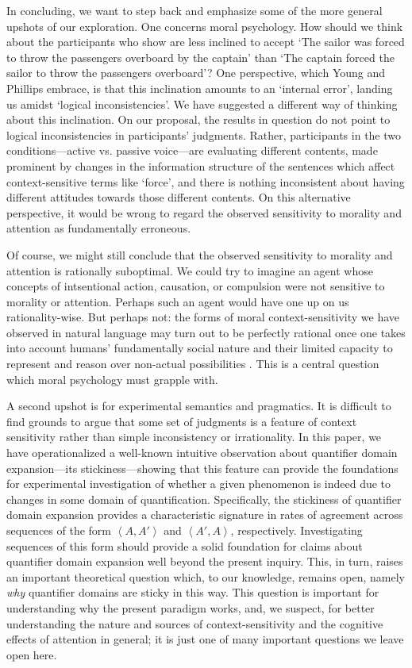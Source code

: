 \documentclass{salt}
\newcommand{\seq}[1]{\left\langle {#1} \right\rangle}
\begin{document}
In concluding, we want to step back and emphasize some of the more general upshots of our exploration. One concerns moral psychology. How should we think about the participants who show are less inclined to accept `The sailor was forced to throw the passengers overboard by the captain' than `The captain  forced the sailor to throw the passengers overboard'? One perspective, which Young and Phillips embrace, is that this inclination amounts to an `internal error', landing us amidst `logical inconsistencies'. We have suggested a different way of thinking about this inclination. On our proposal, the results in question do not point to logical inconsistencies in participants' judgments. Rather, participants in the two conditions---active vs. passive voice---are evaluating different contents, made prominent by changes in the information structure of the sentences which affect context-sensitive terms like `force', and there is nothing inconsistent about having different attitudes towards those different contents. On this alternative perspective, it would be wrong to regard the observed sensitivity to morality and attention as fundamentally erroneous. 

Of course, we might still conclude that the observed sensitivity to morality and attention is rationally suboptimal. We could try to imagine an agent whose concepts of intsentional action, causation, or compulsion were not sensitive to morality or attention. Perhaps such an agent would have one up on us rationality-wise. But perhaps not: the forms of moral context-sensitivity we have observed in natural language may turn out to be perfectly rational once one takes into account humans' fundamentally social nature and their limited capacity to represent and reason over non-actual possibilities \citep{phillips2018psychological,Phillips2017morality,Shtulman2018}. This is a central question which moral psychology must grapple with.

A second upshot is for experimental semantics and pragmatics. It is difficult to find grounds to argue that some set of judgments is a feature of context sensitivity rather than simple inconsistency or irrationality. In this paper, we have operationalized a well-known intuitive observation about quantifier domain expansion---its stickiness---showing that this feature can provide the foundations for experimental investigation of whether a given phenomenon is indeed due to changes in some domain of quantification. Specifically, the stickiness of quantifier domain expansion provides a characteristic signature in rates of agreement across sequences of the form $\seq{A,A'}$ and $\seq{A',A}$, respectively. Investigating sequences of this form should provide a solid foundation for claims about quantifier domain expansion well beyond the present inquiry. This, in turn, raises an important theoretical question which, to our knowledge, remains open, namely \emph{why} quantifier domains are sticky in this way. This question is important for understanding why the present paradigm works, and, we suspect, for better understanding the nature and sources of context-sensitivity and the cognitive effects of attention in general; it is just one of many important questions we leave open here.


   
\end{document}
